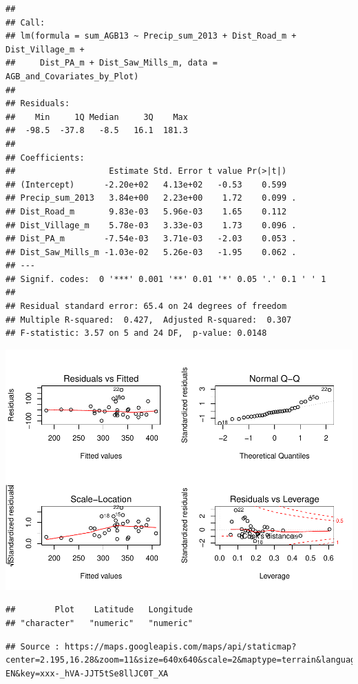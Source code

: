 \documentclass[12pt,]{article}
\begin{document}
\begin{verbatim}
## 
## Call:
## lm(formula = sum_AGB13 ~ Precip_sum_2013 + Dist_Road_m + Dist_Village_m + 
##     Dist_PA_m + Dist_Saw_Mills_m, data = AGB_and_Covariates_by_Plot)
## 
## Residuals:
##    Min     1Q Median     3Q    Max 
##  -98.5  -37.8   -8.5   16.1  181.3 
## 
## Coefficients:
##                   Estimate Std. Error t value Pr(>|t|)  
## (Intercept)      -2.20e+02   4.13e+02   -0.53    0.599  
## Precip_sum_2013   3.84e+00   2.23e+00    1.72    0.099 .
## Dist_Road_m       9.83e-03   5.96e-03    1.65    0.112  
## Dist_Village_m    5.78e-03   3.33e-03    1.73    0.096 .
## Dist_PA_m        -7.54e-03   3.71e-03   -2.03    0.053 .
## Dist_Saw_Mills_m -1.03e-02   5.26e-03   -1.95    0.062 .
## ---
## Signif. codes:  0 '***' 0.001 '**' 0.01 '*' 0.05 '.' 0.1 ' ' 1
## 
## Residual standard error: 65.4 on 24 degrees of freedom
## Multiple R-squared:  0.427,  Adjusted R-squared:  0.307 
## F-statistic: 3.57 on 5 and 24 DF,  p-value: 0.0148
\end{verbatim}

\includegraphics{Project_Template_files/figure-latex/modelfit-1.pdf}
\newpage

\begin{verbatim}
##        Plot    Latitude   Longitude 
## "character"   "numeric"   "numeric"
\end{verbatim}

\begin{verbatim}
## Source : https://maps.googleapis.com/maps/api/staticmap?center=2.195,16.28&zoom=11&size=640x640&scale=2&maptype=terrain&language=en-EN&key=xxx-_hVA-JJT5tSe8llJC0T_XA
\end{verbatim}
\end{document}
